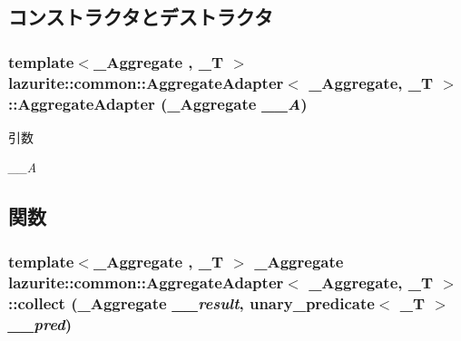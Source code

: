\subsection{コンストラクタとデストラクタ}
\hypertarget{classlazurite_1_1common_1_1_aggregate_adapter_3_01___aggregate_00_01___t_01_4_acbedd79a5cc7a91ad6e2808b09d972da}{
\subsubsection[{AggregateAdapter}]{\setlength{\rightskip}{0pt plus 5cm}template$<$\_\-Aggregate , \_\-T $>$ lazurite::common::AggregateAdapter$<$ \_\-Aggregate, \_\-T $>$::AggregateAdapter (\_\-Aggregate {\em \_\-\_\-A})}}
\label{classlazurite_1_1common_1_1_aggregate_adapter_3_01___aggregate_00_01___t_01_4_acbedd79a5cc7a91ad6e2808b09d972da}

\begin{DoxyParams}{引数}
\item[{\em \_\-\_\-A}]\end{DoxyParams}


\subsection{関数}
\hypertarget{classlazurite_1_1common_1_1_aggregate_adapter_3_01___aggregate_00_01___t_01_4_a666ebbc284a0dd48124b7915d901e9be}{
\subsubsection[{collect}]{\setlength{\rightskip}{0pt plus 5cm}template$<$\_\-Aggregate , \_\-T $>$ \_\-Aggregate lazurite::common::AggregateAdapter$<$ \_\-Aggregate, \_\-T $>$::collect (\_\-Aggregate {\em \_\-\_\-result}, \/  unary\_\-predicate$<$ \_\-T $>$ {\em \_\-\_\-pred})}}
\label{classlazurite_1_1common_1_1_aggregate_adapter_3_01___aggregate_00_01___t_01_4_a666ebbc284a0dd48124b7915d901e9be}

